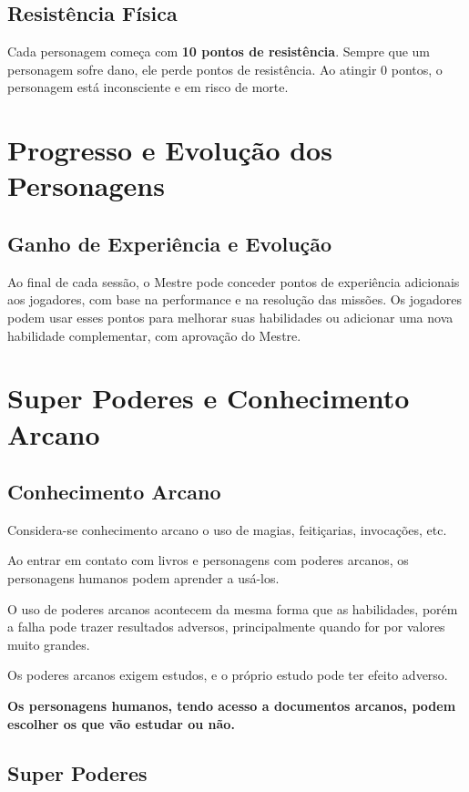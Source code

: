 \documentclass[a4paper,12pt]{book}
\begin{document}
\section{Resistência Física}

Cada personagem começa com \textbf{10 pontos de resistência}. Sempre que um personagem sofre dano, ele perde pontos de resistência. Ao atingir 0 pontos, o personagem está inconsciente e em risco de morte.

\chapter{Progresso e Evolução dos Personagens}

\section{Ganho de Experiência e Evolução}

Ao final de cada sessão, o Mestre pode conceder pontos de experiência adicionais aos jogadores, com base na performance e na resolução das missões. Os jogadores podem usar esses pontos para melhorar suas habilidades ou adicionar uma nova habilidade complementar, com aprovação do Mestre.

\chapter{Super Poderes e Conhecimento Arcano}

\section{Conhecimento Arcano}

Considera-se conhecimento arcano o uso de magias, feitiçarias, invocações, etc.

Ao entrar em contato com livros e personagens com poderes arcanos, os personagens humanos podem aprender a usá-los. 

O uso de poderes arcanos acontecem da mesma forma que as habilidades, porém a falha pode trazer resultados adversos, principalmente quando for por valores muito grandes.

Os poderes arcanos exigem estudos, e o próprio estudo pode ter efeito adverso.

\textbf{Os personagens humanos, tendo acesso a documentos arcanos, podem escolher os que vão estudar ou não.}


\section{Super Poderes}
\end{document}
